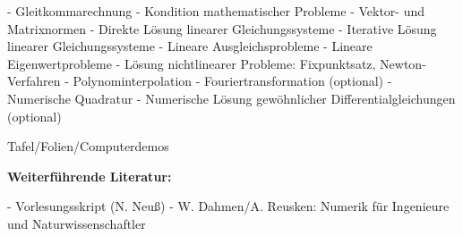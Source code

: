 \begin{course}
\begin{learningoutcomes}
\end{learningoutcomes}

\begin{content}
- Gleitkommarechnung\newline
 - Kondition mathematischer Probleme\newline
 - Vektor- und Matrixnormen\newline
 - Direkte Lösung linearer Gleichungssysteme\newline
 - Iterative Lösung linearer Gleichungssysteme\newline
 - Lineare Ausgleichsprobleme\newline
 - Lineare Eigenwertprobleme\newline
 - Lösung nichtlinearer Probleme: Fixpunktsatz, Newton-Verfahren\newline
 - Polynominterpolation\newline
 - Fouriertransformation (optional)\newline
 - Numerische Quadratur\newline
 - Numerische Lösung gewöhnlicher Differentialgleichungen (optional)


\end{content}

\begin{media}Tafel/Folien/Computerdemos

\end{media}

\begin{literature}\textbf{Weiterführende Literatur:}

- Vorlesungsskript (N. Neuß)\newline
- W. Dahmen/A. Reusken: Numerik für Ingenieure und Naturwissenschaftler

\end{literature}



\end{course}